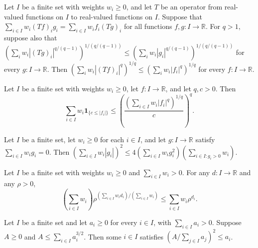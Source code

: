 \begin{theorem}
\leanok
{}
Let $I$ be a finite set with weights $w_i\ge0$, and let $T$ be an operator from
real-valued functions on $I$ to real-valued functions on $I$. Suppose that $\sum_{i\in
I}w_i(Tf)_i g_i=\sum_{i\in I}w_i f_i(Tg)_i$ for all functions $f,g:I\to\mathbb R$. For
$q>1$, suppose also that
$\left(\sum_iw_i|(Tg)_i|^{q/(q-1)}\right)^{1/(q/(q-1))}\le\left(\sum_iw_i|g_i|^{q/(q-1)}\right)^{1/(q/(q-1))}$
for every $g:I\to\mathbb R$. Then
$\left(\sum_iw_i|(Tf)_i|^q\right)^{1/q}\le\left(\sum_iw_i|f_i|^q\right)^{1/q}$ for every
$f:I\to\mathbb R$.
\end{theorem}

\begin{lemma}
\leanok
{}
Let $I$ be a finite set with weights $w_i\ge0$, let $f:I\to\mathbb R$, and let $q,c>0$.
Then
\[
\sum_{i\in I}w_i\mathbf 1_{\{c\le|f_i|\}}\le\left(\frac{\left(\sum_{i\in
I}w_i|f_i|^q\right)^{1/q}}{c}\right)^q.
\]
\end{lemma}

\begin{theorem}
\leanok
{}
Let $I$ be a finite set, let $w_i\ge0$ for each $i\in I$, and let $g:I\to\mathbb R$
satisfy $\sum_{i\in I}w_i g_i=0$. Then $\left(\sum_{i\in
I}w_i|g_i|\right)^2\le4\left(\sum_{i\in I}w_i g_i^2\right)\left(\sum_{i\in
I:g_i>0}w_i\right)$.
\end{theorem}

\begin{theorem}
\leanok
{}
Let $I$ be a finite set with weights $w_i\ge0$ and $\sum_{i\in I}w_i>0$. For any
$d:I\to\mathbb R$ and any $\rho>0$,
\[
\left(\sum_{i\in I}w_i\right)\rho^{\left(\sum_{i\in I}w_i d_i\right)/(\sum_{i\in
I}w_i)}\le\sum_{i\in I}w_i\rho^{d_i}.
\]
\end{theorem}

\begin{theorem}
\leanok
{}
Let $I$ be a finite set and let $a_i\ge0$ for every $i\in I$, with $\sum_{i\in I}a_i>0$.
Suppose $A\ge0$ and $A\le\sum_{i\in I}a_i^{3/2}$. Then some $i\in I$ satisfies
$\left(A/\sum_{j\in I}a_j\right)^2\le a_i$.
\end{theorem}

